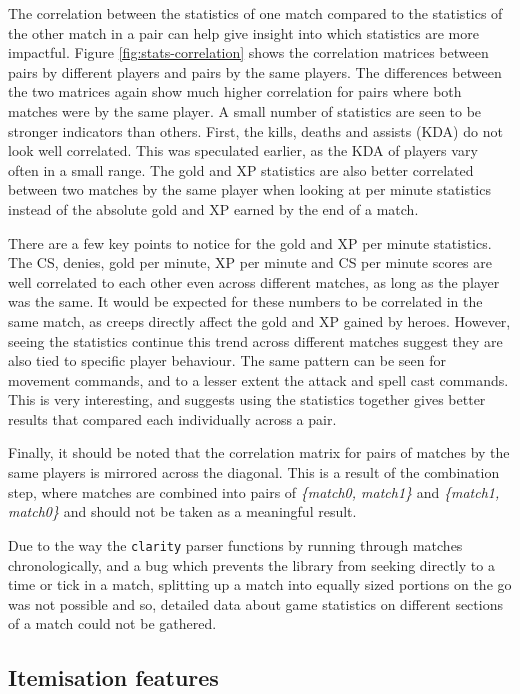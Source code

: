\documentclass[Report.tex]{subfiles}
\begin{document}
The correlation between the statistics of one match compared to the statistics of the other match in a pair can help give insight into which statistics are more impactful. Figure \ref{fig:stats-correlation} shows the correlation matrices between pairs by different players and pairs by the same players. The differences between the two matrices again show much higher correlation for pairs where both matches were by the same player. A small number of statistics are seen to be stronger indicators than others. First, the kills, deaths and assists (KDA) do not look well correlated. This was speculated earlier, as the KDA of players vary often in a small range. The gold and XP statistics are also better correlated between two matches by the same player when looking at per minute statistics instead of the absolute gold and XP earned by the end of a match. 

There are a few key points to notice for the gold and XP per minute statistics. The CS, denies, gold per minute, XP per minute and CS per minute scores are well correlated to each other even across different matches, as long as the player was the same. It would be expected for these numbers to be correlated in the same match, as creeps directly affect the gold and XP gained by heroes. However, seeing the statistics continue this trend across different matches suggest they are also tied to specific player behaviour. The same pattern can be seen for movement commands, and to a lesser extent the attack and spell cast commands. This is very interesting, and suggests using the statistics together gives better results that compared each individually across a pair. 

Finally, it should be noted that the correlation matrix for pairs of matches by the same players is mirrored across the diagonal. This is a result of the combination step, where matches are combined into pairs of \textit{\{match0, match1\}} and \textit{\{match1, match0\}} and should not be taken as a meaningful result.


Due to the way the \texttt{clarity} parser functions by running through matches chronologically, and a bug which prevents the library from seeking directly to a time or tick in a match, splitting up a match into equally sized portions on the go was not possible and so, detailed data about game statistics on different sections of a match could not be gathered.  

\subsection{Itemisation features}
\end{document}
